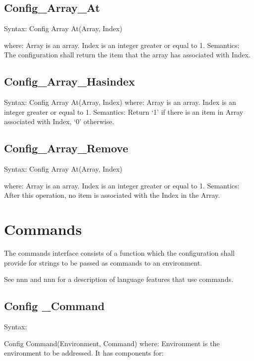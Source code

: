\subsection{Config\_Array\_At}\label{config_array_at}

Syntax: Config Array At(Array, Index)

where: Array is an array. Index is an integer greater or equal to 1.
Semantics: The configuration shall return the item that the array has
associated with Index.

\subsection{Config\_Array\_Hasindex}\label{config_array_hasindex}

Syntax: Config Array At(Array, Index) where: Array is an array. Index is
an integer greater or equal to 1. Semantics: Return `1' if there is an
item in Array associated with Index, `0' otherwise.

\subsection{Config\_Array\_Remove}\label{config_array_remove}

Syntax: Config Array At(Array, Index)

where: Array is an array. Index is an integer greater or equal to 1.
Semantics: After this operation, no item is associated with the Index in
the Array.

\section{Commands}\label{commands}

The commands interface consists of a function which the configuration
shall provide for strings to be passed as commands to an environment.

See nnn and nnn for a description of language features that use
commands.

\subsection{Config \_Command}\label{config-_command}

Syntax:

Config Command(Environment, Command) where: Environment is the
environment to be addressed. It has components for:

